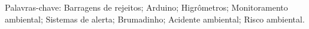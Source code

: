 \begin{resumo}
\begin{SingleSpace}
\vspace{\onelineskip}
\noindent Palavras-chave:  Barragens de rejeitos; Arduino; Higrômetros; Monitoramento ambiental; Sistemas de alerta; Brumadinho; Acidente ambiental; Risco ambiental.

\end{SingleSpace}
\end{resumo}